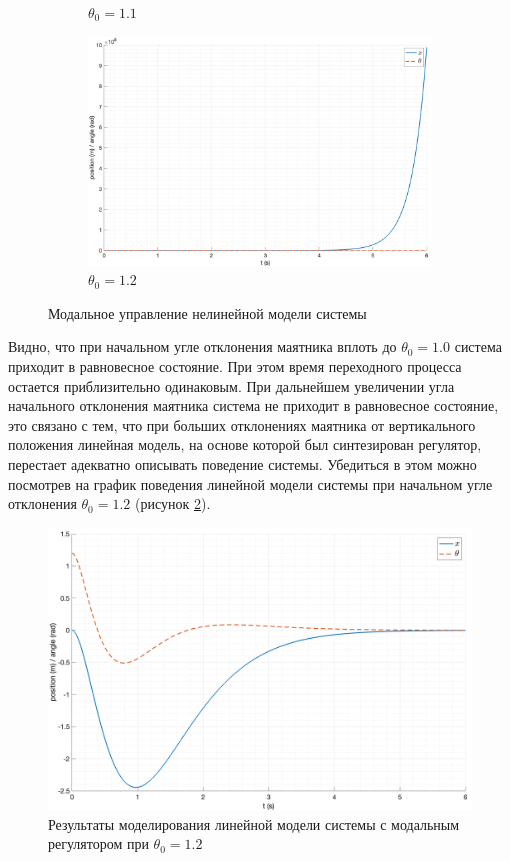 \begin{figure}[ht!]
\begin{subfigure}[b]{0.45\textwidth}
        \caption{$\theta_0 = 1.1$}
    \end{subfigure}
    \begin{subfigure}[b]{0.45\textwidth}
        \includegraphics[width=\textwidth]{media/plots/modal_control/out_6.png}
        \caption{$\theta_0 = 1.2$}
    \end{subfigure}
    \caption{Модальное управление нелинейной модели системы}
    \label{fig:modal_control_initials}
\end{figure}
Видно, что при начальном угле отклонения маятника вплоть до $\theta_0 = 1.0$ система приходит в
равновесное состояние. При этом время переходного процесса остается приблизительно одинаковым. 
При дальнейшем увеличении угла начального отклонения маятника система не приходит в равновесное состояние, 
это связано с тем, что при больших отклонениях маятника от вертикального положения линейная модель, на основе 
которой был синтезирован регулятор, перестает адекватно описывать поведение системы. Убедиться в этом можно 
посмотрев на график поведения линейной модели системы при начальном угле отклонения $\theta_0 = 1.2$ (рисунок \ref{fig:modal_control_linear_out_6}).
\begin{figure}[ht!]
    \centering
    \includegraphics[width=\textwidth]{media/plots/modal_control/linear_out_6.png}
    \caption{Результаты моделирования линейной модели системы с модальным регулятором при $\theta_0 = 1.2$}
    \label{fig:modal_control_linear_out_6}
\end{figure}
